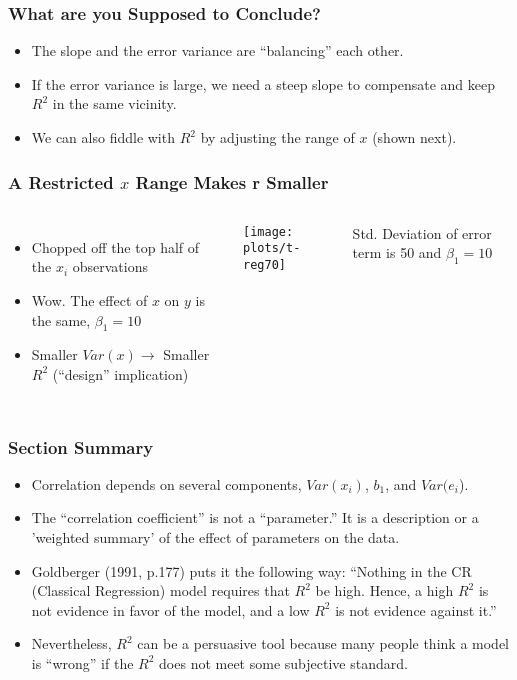 \documentclass[10pt,english]{beamer}
\newenvironment{topcolumns}{\begin{columns}[t]}{\end{columns}}
\def\Sweavesize{\normalsize}
\begin{document}
\begin{frame}[containsverbatim]
\frametitle{What are you Supposed to Conclude?}
\begin{itemize}
\item The slope and the error variance are ``balancing'' each other.
\item If the error variance is large, we need a steep slope to compensate
and keep $R^{2}$ in the same vicinity.
\item We can also fiddle with $R^{2}$ by adjusting the range of $x$ (shown
next).
\end{itemize}
\end{frame}

\begin{frame}[containsverbatim]
\frametitle{A Restricted $x$ Range Makes r Smaller}


\begin{topcolumns}%


\column{6cm}
\begin{itemize}
\item Chopped off the top half of the $x_{i}$ observations
\item Wow. The effect of $x$ on $y$ is the same, $\beta_{1}=10$ 
\item Smaller $Var(x)$$\rightarrow$ Smaller $R^{2}$ (``design'' implication)
\end{itemize}

\def\Sweavesize{\scriptsize}



\column{6cm}


\texttt{[image: plots/t-reg70]}

Std. Deviation of error term is 50 and $\beta_{1}=10$
\end{topcolumns}%
\end{frame}

\begin{frame}[containsverbatim]
\frametitle{Section Summary}
\begin{itemize}
\item Correlation depends on several components, $Var(x_{i})$, $b_{1}$,
and $Var(e_{i}$).
\item The ``correlation coefficient'' is not a ``parameter.'' It is
a description or a 'weighted summary' of the effect of parameters
on the data. 
\item Goldberger (1991, p.177) puts it the following way: \textquotedblleft{}Nothing
in the CR (Classical Regression) model requires that $R^{2}$ be high.
Hence, a high $R^{2}$ is not evidence in favor of the model, and
a low $R^{2}$ is not evidence against it.\textquotedblright{} 
\item Nevertheless, $R^{2}$ can be a persuasive tool because many people
think a model is ``wrong'' if the $R^{2}$ does not meet some subjective
standard.
\end{itemize}
\end{frame}
\end{document}
